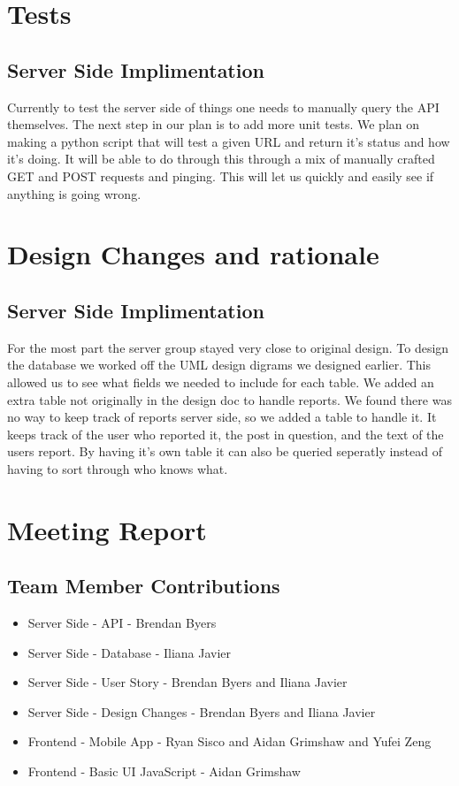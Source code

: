 \documentclass[12pt]{article}
\begin{document}
\section{Tests}
\subsection{Server Side Implimentation}
Currently to test the server side of things one needs to manually query the API themselves.  The next step in our plan is to add more unit tests.  We plan on making a python script that will test a given URL and return it's status and how it's doing.  It will be able to do through this through a mix of manually crafted GET and POST requests and pinging.  This will let us quickly and easily see if anything is going wrong.
\section{Design Changes and rationale}
\subsection{Server Side Implimentation}
For the most part the server group stayed very close to original design.  To design the database we worked off the UML design digrams we designed earlier.  This allowed us to see what fields we needed to include for each table.  We added an extra table not originally in the design doc to handle reports.  We found there was no way to keep track of reports server side, so we added a table to handle it.  It keeps track of the user who reported it, the post in question, and the text of the users report.  By having it's own table it can also be queried seperatly instead of having to sort through who knows what.
\section{Meeting Report}

\subsection{Team Member Contributions}
\begin{itemize}
      \item Server Side - API - Brendan Byers
      \item Server Side - Database - Iliana Javier
      \item Server Side - User Story - Brendan Byers and Iliana Javier
      \item Server Side - Design Changes - Brendan Byers and Iliana Javier
      \item Frontend - Mobile App - Ryan Sisco and Aidan Grimshaw and Yufei Zeng
      \item Frontend - Basic UI JavaScript - Aidan Grimshaw
\end{itemize}
\end{document}
